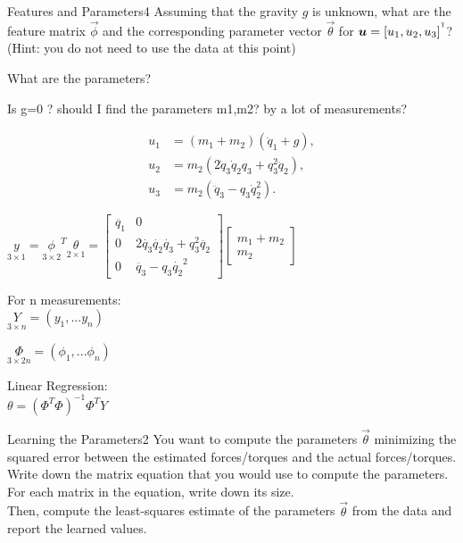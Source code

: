 \begin{questions}


\begin{question}{Features and Parameters}{4}
Assuming that the gravity $g$ is unknown, what are the feature matrix $\vec{\phi}$ and the corresponding parameter vector $\vec{\theta}$ for ${\boldsymbol{u}}=[u_{1},u_{2},u_{3}]^{^\mathsf{T}}$?
(Hint: you do not need to use the data at this point)

\begin{answer}
	
	What are the parameters?
	
	Is g=0 ? should I find the parameters m1,m2? by a lot of measurements?
	
		\begin{align*}
		u_{1} &= (m_{1}+m_{2})(\ddot{q}_{1}+g),\\
		u_{2} &= m_{2}(2\dot{q}_{3}\dot{q}_{2}q_{3}+q_{3}^{2}\ddot{q}_{2}),\\
		u_{3} &= m_{2}(\ddot{q}_{3}-q_{3}\dot{q}_{2}^{2}).
		\end{align*}
		
	$\underset{3\times 1} y= \underset{3\times 2} \phi^T \underset{2\times 1} \theta= \begin{bmatrix}
	\ddot{q_1}&0\\0&2\dot{q_3}\dot{q_2}\dot{q_3}+q_3^2\ddot{q_2}\\0&\ddot{q_3}-q_3 \dot{q_2}^2
	\end{bmatrix}
	\begin{bmatrix}
	m_1+m_2\\m_2
	\end{bmatrix}$
	
	For n measurements: \\
	$\underset{3 \times n}Y=(y_1,...y_n)$
	
	$\underset{3 \times 2n}\Phi=(\phi_1,...\phi_n)$
	
	Linear Regression:\\
	$\theta = (\Phi^T \Phi)^{-1} \Phi^T Y$

	\end{answer}

\end{question}



\begin{question}{Learning the Parameters}{2}
You want to compute the parameters $\vec{\theta}$ minimizing the squared error between the estimated forces/torques and the actual forces/torques.
Write down the matrix equation that you would use to compute the parameters. For each matrix in the equation, write down its size.\\
Then, compute the least-squares estimate of the parameters $\vec{\theta}$ from the data and report the learned values.


\end{question}
\end{questions}
